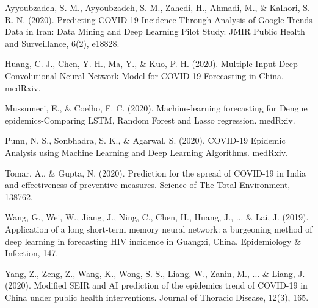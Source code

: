 ﻿\documentclass{article}
\begin{document}
\newpage

\begin{thebibliography}{7}

\bibitem{}
Ayyoubzadeh, S. M., Ayyoubzadeh, S. M., Zahedi, H., Ahmadi, M., \& Kalhori, S. R.
N. (2020). Predicting COVID-19 Incidence Through Analysis of Google Trends Data
in Iran: Data Mining and Deep Learning Pilot Study. JMIR Public Health and
Surveillance, 6(2), e18828.

\bibitem{}
Huang, C. J., Chen, Y. H., Ma, Y., \& Kuo, P. H. (2020). Multiple-Input Deep
Convolutional Neural Network Model for COVID-19 Forecasting in China. medRxiv.

\bibitem{}
Mussumeci, E., \& Coelho, F. C. (2020). Machine-learning forecasting for Dengue
epidemics-Comparing LSTM, Random Forest and Lasso regression. medRxiv.

\bibitem{}
Punn, N. S., Sonbhadra, S. K., \& Agarwal, S. (2020). COVID-19 Epidemic Analysis
using Machine Learning and Deep Learning Algorithms. medRxiv.

\bibitem{}
Tomar, A., \& Gupta, N. (2020). Prediction for the spread of COVID-19 in India
and effectiveness of preventive measures. Science of The Total Environment,
138762.

\bibitem{}
Wang, G., Wei, W., Jiang, J., Ning, C., Chen, H., Huang, J., ... \& Lai, J.
(2019). Application of a long short-term memory neural network: a burgeoning
method of deep learning in forecasting HIV incidence in Guangxi, China.
Epidemiology \& Infection, 147.

\bibitem{}
Yang, Z., Zeng, Z., Wang, K., Wong, S. S., Liang, W., Zanin, M., ... \& Liang, J.
(2020). Modified SEIR and AI prediction of the epidemics trend of COVID-19 in
China under public health interventions. Journal of Thoracic Disease, 12(3),
165.

\end{thebibliography}
\end{document}
